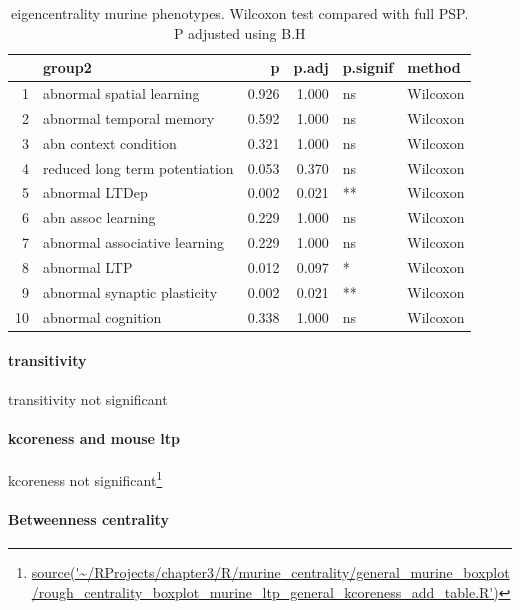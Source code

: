 \begin{table}[ht]
\centering
\begin{tabular}{rlrrll}
  \toprule
 & group2 & p & p.adj & p.signif & method \\ 
  \midrule
1 & abnormal spatial learning & 0.926 & 1.000 & ns & Wilcoxon \\ 
  2 & abnormal temporal memory & 0.592 & 1.000 & ns & Wilcoxon \\ 
  3 & abn context condition & 0.321 & 1.000 & ns & Wilcoxon \\ 
  4 & reduced long term potentiation & 0.053 & 0.370 & ns & Wilcoxon \\ 
  5 & abnormal LTDep & 0.002 & 0.021 & ** & Wilcoxon \\ 
  6 & abn assoc learning & 0.229 & 1.000 & ns & Wilcoxon \\ 
  7 & abnormal associative learning & 0.229 & 1.000 & ns & Wilcoxon \\ 
  8 & abnormal LTP & 0.012 & 0.097 & * & Wilcoxon \\ 
  9 & abnormal synaptic plasticity & 0.002 & 0.021 & ** & Wilcoxon \\ 
  10 & abnormal cognition & 0.338 & 1.000 & ns & Wilcoxon \\ 
   \bottomrule
\end{tabular}
\caption{eigencentrality murine phenotypes. Wilcoxon test compared with full PSP. P adjusted using B.H} 
\label{tab:eigencentrality murine phenotypes. Wilcoxon test compared with full PSP}
\end{table}
\paragraph{transitivity}

transitivity not significant


\paragraph{kcoreness and mouse ltp}
kcoreness not significant\footnote{\url{source('~/RProjects/chapter3/R/murine_centrality/general_murine_boxplot/rough_centrality_boxplot_murine_ltp_general_kcoreness_add_table.R')}}


\paragraph{Betweenness centrality}







